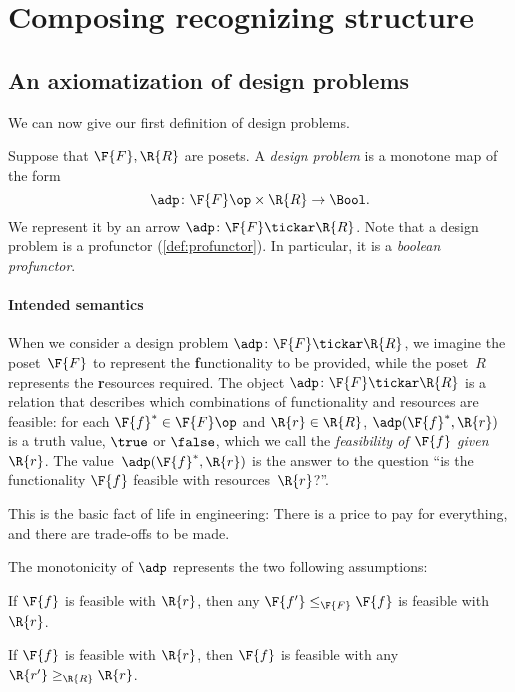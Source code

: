 \section{Composing recognizing structure}
\label{sec:dpdefinition}
\subsection{An axiomatization of design problems}
We can now give our first definition of design problems.



\begin{definition} \label{def:design-problem}
Suppose that $\F{F}, \R{R}$ are posets. A \emph{design problem} is a monotone map of the form
\begin{equation}
	\adp \colon  \F{F}\op \times \R{R} \to \Bool.
\end{equation}
We represent it by an arrow $\adp \colon \F{F} \tickar \R{R}$. Note that a design problem is a profunctor (\cref{def:profunctor}). In particular, it is a \emph{boolean profunctor}.
\end{definition}

\paragraph{Intended semantics}
When we consider a design problem $\adp\colon \F{F} \tickar \R{R}$, we imagine the poset~$\F{F}$ to represent the \textbf{f}unctionality to be provided, while the poset~$R$ represents the \textbf{r}esources required. The object $\adp \colon \F{F} \tickar \R{R}$ is a relation that describes which combinations of functionality and resources are feasible: for each $\F{f}^* \in \F{F}\op$ and $\R{r} \in \R{R}$, $\adp(\F{f}^*,\R{r})$ is a truth value, $\true$ or $\false$, which we call the \emph{feasibility of $\F{f}$ given $\R{r}$}. The value~$\adp(\F{f}^*,\R{r})$ is the answer to the question ``is the functionality $\F{f}$ feasible with resources~$\R{r}$?''.

\noindent This is the basic fact of life in engineering: There is a price to pay for everything, and there are trade-offs to be made.

\noindent The monotonicity of $\adp$ represents the two following assumptions:

\begin{compactenum}
\item If $\F{f}$ is feasible with $\R{r}$, then any $\F{f'} \leq_\F{F} \F{f}$ is feasible with $\R{r}$.
\item If $\F{f}$ is feasible with $\R{r}$, then $\F{f}$ is feasible with any $\R{r'} \geq_\R{R} \R{r}$.
\end{compactenum}

